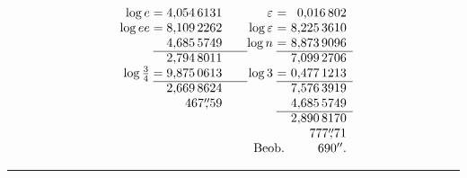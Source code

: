 \[
\begin{array}{r@{\;}c@{\;}r@{\qquad}r@{\;}c@{\;}r}
 \log e&=&4{,}054\,6131 &\varepsilon&=&0{,}016\,802\\
 \log ee&=&8{,}109\,2262 &\log\varepsilon&=&8{,}225\,3610\\
 &&4{,}685\,5749 &\log n&=&8{,}873\,9096\\ \cline{2-3}\cline{5-6}
 &&2{,}794\,8011 &&&7{,}099\,2706\\
 \log\tfrac34&=&9{,}875\,0613 &\log3&=&0{,}477\,1213\\ \cline{2-3}\cline{5-6}
 &&2{,}669\,8624 &&&7{,}576\,3919\\
 &&467\overset{\prime\prime}{,}59 &&&4{,}685\,5749\\ \cline{5-6}
 &&&&&2{,}890\,8170\\
 &&&&&777\overset{\prime\prime}{,}71\\
 &&&\multicolumn{2}{r}{\text{Beob.}}&690^{\prime\prime}.
\end{array}
\]
\par\begin{center}\rule{.18\linewidth}{.4pt}\end{center}
\clearpage
\endgroup
